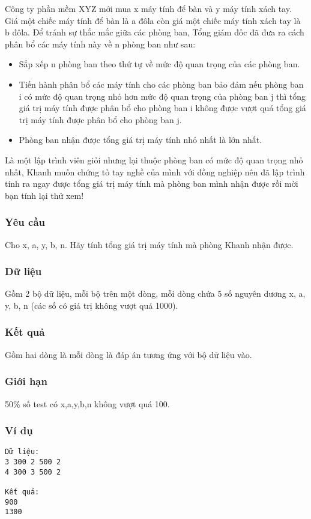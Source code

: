 



   Công ty phần mềm XYZ mới mua x máy tính để bàn và y máy tính xách tay. Giá một chiếc máy tính để bàn là a đôla còn giá một chiếc máy tính xách tay là b đôla. Để tránh sự thắc mắc giữa các phòng ban, Tổng giám đốc đã đưa ra cách phân bổ các máy tính này về n phòng ban như sau:  
\begin{itemize}
	\item     Sắp xếp n phòng ban theo thứ tự về mức độ quan trọng của các phòng ban.   
	\item     Tiến hành phân bổ các máy tính cho các phòng ban bảo đảm nếu phòng ban i có mức độ quan trọng nhỏ hơn mức độ quan trọng của phòng ban j thì tổng giá trị máy tính được phân bổ cho phòng ban i không được vượt quá tổng giá trị máy tính được phân bổ cho phòng ban j.   
	\item     Phòng ban nhận được tổng giá trị máy tính nhỏ nhất là lớn nhất.   
\end{itemize}

   Là một lập trình viên giỏi nhưng lại thuộc phòng ban có mức độ quan trọng nhỏ nhất, Khanh muốn chứng tỏ tay nghề của mình với đồng nghiệp nên đã lập trình tính ra ngay được tổng giá trị máy tính mà phòng ban mình nhận được rồi mời bạn tính lại thử xem!  

\subsubsection{   Yêu cầu  }

   Cho x, a, y, b, n. Hãy tính tổng giá trị máy tính mà phòng Khanh nhận được.  

\subsubsection{   Dữ liệu  }

   Gồm 2 bộ dữ liệu, mỗi bộ trên một dòng, mỗi dòng chứa 5 số nguyên dương x, a, y, b, n (các số có giá trị không vượt quá 1000).  

\subsubsection{   Kết quả  }

   Gồm hai dòng là mỗi dòng là đáp án tương ứng với bộ dữ liệu vào.  

\subsubsection{   Giới hạn  }

   50\% số test có x,a,y,b,n không vượt quá 100.  

\subsubsection{   Ví dụ  }
\begin{verbatim}
Dữ liệu:
3 300 2 500 2
4 300 3 500 2

Kết quả:
900
1300

\end{verbatim}